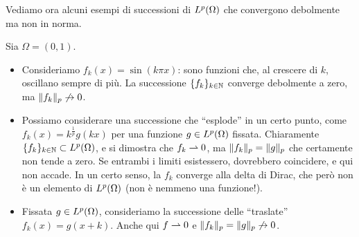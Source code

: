 Vediamo ora alcuni esempi di successioni di $\leb[p]{\Omega}$ che convergono debolmente ma non in norma.
\begin{esempio} \label{es:convergenza-debole-ma-non-forte}
   Sia $\Omega=(0,1)$.
   \begin{itemize}
       \item Consideriamo $f_k(x)=\sin(k\pi x)$: sono funzioni che, al crescere di $k$, oscillano sempre di più.
           La successione $\{f_k\}_{k\in\N}$ converge debolmente a zero, ma $\norm{f_k}_p\not\to 0$.
       \item Possiamo considerare una successione che ``esplode'' in un certo punto, come $f_k(x)=k^\frac1{p}g(kx)$ per una funzione $g\in\leb[p]{\Omega}$ fissata.
           Chiaramente $\{f_k\}_{k\in\N}\subset\leb[p]{\Omega}$, e si dimostra che $f_k\weakto 0$, ma $\norm{f_k}_p=\norm{g}_p$ che certamente non tende a zero.
           Se entrambi i limiti esistessero, dovrebbero coincidere, e qui non accade.
           In un certo senso, la $f_k$ converge alla delta di Dirac, che però non è un elemento di $\leb[p]{\Omega}$ (non è nemmeno una funzione!).
       \item Fissata $g\in\leb[p]{\Omega}$, consideriamo la successione delle ``traslate'' $f_k(x)=g(x+k)$.
           Anche qui $f\weakto 0$ e $\norm{f_k}_p=\norm{g}_p\not\to 0$.
   \end{itemize}
\end{esempio}

